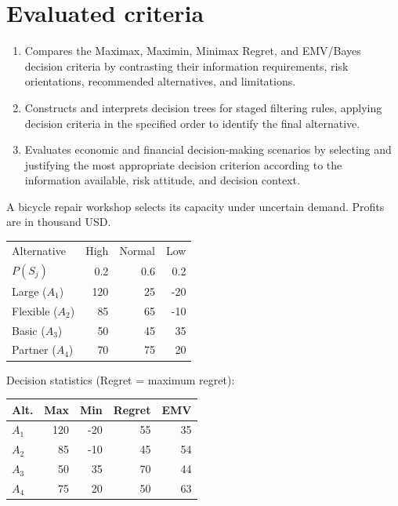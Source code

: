 \section*{Evaluated criteria}
\begin{enumerate}[label=\textbf{C\arabic*},start=8]
\item Compares the Maximax, Maximin, Minimax Regret, and EMV/Bayes decision criteria by contrasting their information requirements, risk orientations, recommended alternatives, and limitations.
\item Constructs and interprets decision trees for staged filtering rules, applying decision criteria in the specified order to identify the final alternative.
\item Evaluates economic and financial decision-making scenarios by selecting and justifying the most appropriate decision criterion according to the information available, risk attitude, and decision context.
\end{enumerate}



A bicycle repair workshop selects its capacity under uncertain demand. Profits are in thousand USD.

\vspace{-3mm}
\begin{center}\small\setlength{\tabcolsep}{4pt}
	\begin{tabular}{lrrr}\toprule
		Alternative & High & Normal & Low\\
		$P(S_j)$ & 0.2 & 0.6 & 0.2\\ \midrule
		Large ($A_1$) & 120 & 25 & -20\\
		Flexible ($A_2$) & 85 & 65 & -10\\
		Basic ($A_3$) & 50 & 45 & 35\\
		Partner ($A_4$) & 70 & 75 & 20\\
		\bottomrule
	\end{tabular}
\end{center} \vspace*{-3mm}

Decision statistics (Regret = maximum regret):

\vspace{-3mm}
\begin{center}\small\setlength{\tabcolsep}{4pt}
	\begin{tabular}{lrrrr}\toprule
		Alt. & Max & Min & Regret & EMV\\ \midrule
		$A_1$ & 120 & -20 & 55 & 35\\
		$A_2$ & 85 & -10 & 45 & 54\\
		$A_3$ & 50 & 35 & 70 & 44\\
		$A_4$ & 75 & 20 & 50 & 63\\
		\bottomrule
	\end{tabular}
\end{center}
\vspace{-3mm}

